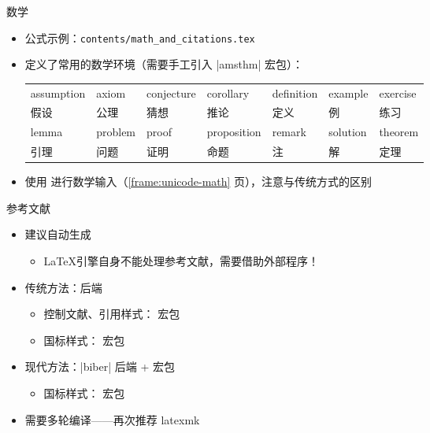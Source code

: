 \begin{frame}[fragile]{数学}
  \begin{itemize}
    \item 公式示例：\nolinkurl{contents/math_and_citations.tex}
    \item \SJTUThesis{} 定义了常用的数学环境（需要手工引入 |amsthm| 宏包）：
      \begin{table}[h]
        \centering
        \footnotesize
        \begin{tabular}{*{7}{l}}\toprule
          assumption  & axiom   & conjecture & corollary    & definition  & example   & exercise  \\
          假设        & 公理    & 猜想       & 推论         & 定义        & 例        & 练习      \\\midrule
          lemma       & problem & proof      & proposition  & remark      & solution  & theorem   \\
          引理        & 问题    & 证明       & 命题         & 注          & 解        & 定理      \\\bottomrule
        \end{tabular}
      \end{table}
      \item \SJTUThesis{} 使用  进行数学输入（\ref{frame:unicode-math} 页），注意与传统方式的区别
  \end{itemize}
\end{frame}

\begin{frame}[fragile]{参考文献}
  \begin{itemize}
    \item 建议自动生成
      \begin{itemize}
        \item \LaTeX 引擎自身不能处理参考文献，需要借助外部程序！
      \end{itemize}
    \item 传统方法：\BibTeX 后端
      \begin{itemize}
        \item 控制文献、引用样式： 宏包
        \item 国标样式： 宏包 
      \end{itemize}
    \item 现代方法：|biber| 后端 +  宏包
      \begin{itemize}
        \item 国标样式： 宏包 
      \end{itemize}
    \item 需要多轮编译——再次推荐 latexmk
  \end{itemize}
\end{frame}

